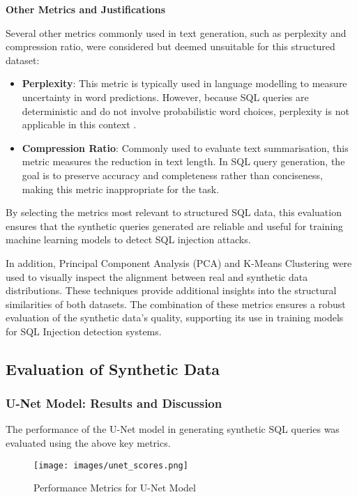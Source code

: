\documentclass[journal]{IEEEtran}
\begin{document}
\textbf{Other Metrics and Justifications}

Several other metrics commonly used in text generation, such as perplexity and compression ratio, were considered but deemed unsuitable for this structured dataset:

\begin{itemize}
    \item \textbf{Perplexity}: This metric is typically used in language modelling to measure uncertainty in word predictions. However, because SQL queries are deterministic and do not involve probabilistic word choices, perplexity is not applicable in this context \cite{goldstein1999summarizing}.

    \item \textbf{Compression Ratio}: Commonly used to evaluate text summarisation, this metric measures the reduction in text length. In SQL query generation, the goal is to preserve accuracy and completeness rather than conciseness, making this metric inappropriate for the task.
\end{itemize}

By selecting the metrics most relevant to structured SQL data, this evaluation ensures that the synthetic queries generated are reliable and useful for training machine learning models to detect SQL injection attacks.

In addition, Principal Component Analysis (PCA) and K-Means Clustering were used to visually inspect the alignment between real and synthetic data distributions. These techniques provide additional insights into the structural similarities of both datasets. The combination of these metrics ensures a robust evaluation of the synthetic data's quality, supporting its use in training models for SQL Injection detection systems.

\subsection{Evaluation of Synthetic Data}
\subsubsection{U-Net Model: Results and Discussion}
The performance of the U-Net model in generating synthetic SQL queries was evaluated using the above key metrics. 

\begin{figure}[H]
    \centering
    \texttt{[image: images/unet\_scores.png]}
    \caption{Performance Metrics for U-Net Model}
    \label{fig:unet_metrics}
\end{figure}
\end{document}
